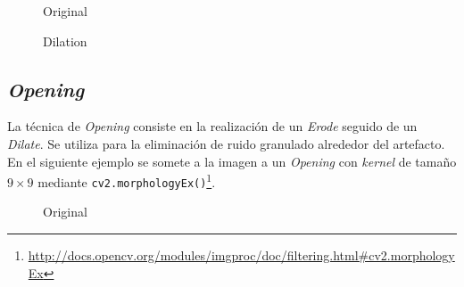 \begin{figure}[H]
  \caption{Original}
  \centering \setlength\fboxsep{0pt} \setlength\fboxrule{0.5pt}
\end{figure}

\begin{figure}[H]
  \centering \setlength\fboxsep{0pt} \setlength\fboxrule{0.5pt}
  \caption{Dilation}
\end{figure}

\subsection{\emph{Opening}}
La técnica de \emph{Opening} consiste en la realización de un
\emph{Erode} seguido de un \emph{Dilate}. Se utiliza para la
eliminación de ruido granulado alrededor del artefacto.\\
En el siguiente ejemplo se somete a la imagen a un \emph{Opening} con
\emph{kernel} de tamaño $9 \times 9$ mediante
\texttt{cv2.morphologyEx()}\footnote{\url{http://docs.opencv.org/modules/imgproc/doc/filtering.html\#cv2.morphologyEx}}.

\begin{figure}[H]
  \caption{Original}
  \centering \setlength\fboxsep{0pt} \setlength\fboxrule{0.5pt}
\end{figure}

